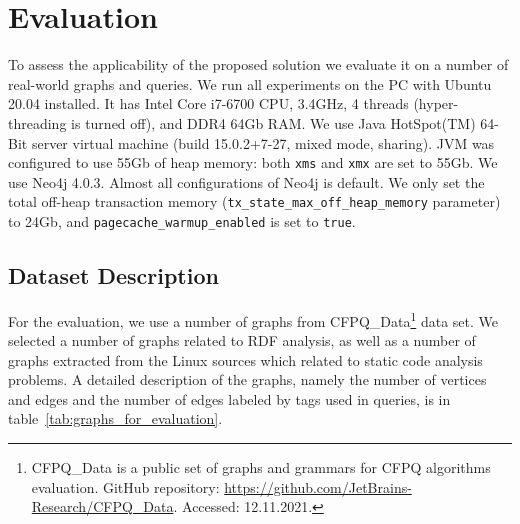 \section{Evaluation}

To assess the applicability of the proposed solution we evaluate it on a number of real-world graphs and queries. We run all experiments on the PC with Ubuntu 20.04 installed. It has Intel Core i7-6700 CPU, 3.4GHz, 4 threads (hyper-threading is turned off), and DDR4 64Gb RAM. We use Java HotSpot(TM) 64-Bit server virtual machine (build 15.0.2+7-27, mixed mode, sharing). JVM was configured to use 55Gb of heap memory: both \texttt{xms} and \texttt{xmx} are set to 55Gb. We use Neo4j 4.0.3. Almost all configurations of Neo4j is default. We only set the total off-heap transaction memory (\texttt{tx\_state\_max\_off\_heap\_memory} parameter) to 24Gb, and \texttt{pagecache\_warmup\_enabled} is set to \texttt{true}.

\subsection{Dataset Description}

For the evaluation, we use a number of graphs from CFPQ\_Data\footnote{CFPQ\_Data is a public set of graphs and grammars for CFPQ algorithms evaluation. GitHub repository: \url{https://github.com/JetBrains-Research/CFPQ_Data}. Accessed: 12.11.2021. } data set. We selected a number of graphs related to RDF analysis, as well as a number of graphs extracted from the Linux sources which related to static code analysis problems. A detailed description of the graphs, namely the number of vertices and edges and the number of edges labeled by tags used in queries, is in table~\ref{tab:graphs_for_evaluation}. 

